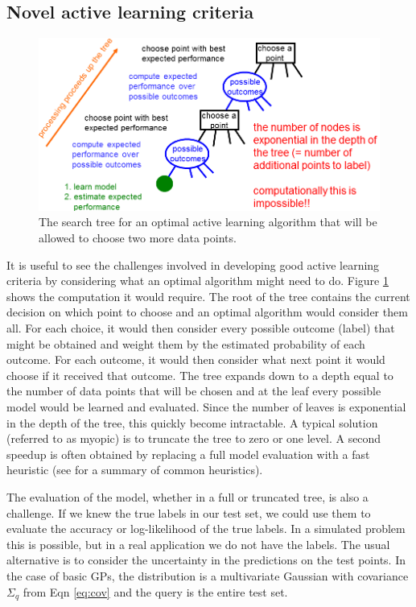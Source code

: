\documentclass[prd,nofootbib,floatfix,11pt,tightenlines]{revtex4}
\begin{document}
\subsection{Novel active learning criteria}

\begin{figure}[t]
\centerline{\includegraphics[scale=0.4]{searchtree.png}}
\caption{The search tree for an optimal active learning algorithm that will
  be allowed to choose two more data points.}
\label{fig:searchtree}
\end{figure}

It is useful to see the challenges involved in developing good active
learning criteria by considering what an optimal algorithm might need to
do.  Figure \ref{fig:searchtree} shows the computation it would require.
The root of the tree contains the current decision on which point to choose
and an optimal algorithm would consider them all.  For each choice, it
would then consider every possible outcome (label) that might be obtained
and weight them by the estimated probability of each outcome.  For each
outcome, it would then consider what next point it would choose if it
received that outcome.  The tree expands down to a depth equal to the
number of data points that will be chosen and at the leaf every possible
model would be learned and evaluated.  Since the number of leaves is
exponential in the depth of the tree, this quickly become intractable.  A
typical solution (referred to as myopic) is to truncate the tree to zero or
one level.  A second speedup is often obtained by replacing a full model
evaluation with a fast heuristic (see \cite{Settles09} for a summary of
common heuristics).

The evaluation of the model, whether in a full or truncated tree, is also a
challenge.  If we knew the true labels in our test set, we could use them
to evaluate the accuracy or log-likelihood of the true labels.  In a
simulated problem this is possible, but in a real application we do not
have the labels.  The usual alternative is to consider the uncertainty in
the predictions on the test points.  In the case of basic GPs, the
distribution is a multivariate Gaussian with covariance $\Sigma_q$ from
Eqn \ref{eq:cov} and the query is the entire test set.
\end{document}
